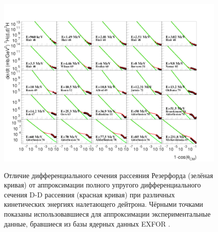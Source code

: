 \documentclass[a4paper,12pt]{article}
\begin{document}
\begin{large}
\begin{figure}[ht]
  {
     \includegraphics[width=0.99\linewidth]{images/difference_of_elastic_dd_from_rutherford_differential_cross_section.pdf}
  }
  \caption{Отличие дифференциального сечения рассеяния Резерфорда (зелёная кривая) от аппроксимации \cite{70/778-T} полного упругого дифференциального сечения D-D рассеяния (красная кривая) при различных кинетических энергиях налетающего дейтрона. Чёрными точками показаны использовавшиеся для аппроксимации экспериментальные данные, бравшиеся из базы ядерных данных EXFOR \cite{DD1_Blair,DD2_Wilson,DD3_Brolley,DD4_Burrows,DD5_Nemec,DD6_Rosen1,DD7_Rosen2,
  DD8_Allred,DD9_Jarmie,DD10_Okihana,DD11_Itoh,DD_Oers,DD12_Beliuskina,DD13_Alderliesten,
  DD14_Brueckmann,DD15_Micherdzinska}.}
  \label{fig:DifferenceOfElasticDDFromRutherfordDifferentialCrossSection}
\end{figure}	
	

\end{large}
\end{document}
